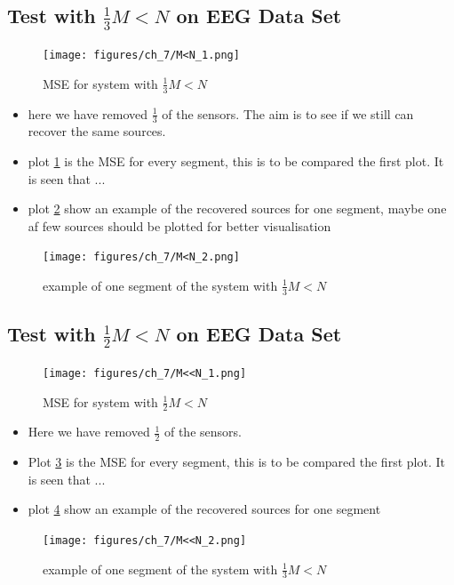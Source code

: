 \subsection{Test with $\frac{1}{3} M<N$ on EEG Data Set}
\begin{figure}[H]
    \centering
	\texttt{[image: figures/ch\_7/M<N\_1.png]}
	\caption{MSE for system with $\frac{1}{3} M<N$}
	\label{fig:M<N_1}
\end{figure}  
\begin{itemize}
\item  here we have removed $\frac{1}{3}$ of the sensors. The aim is to see if we still can recover the same sources. 
\item plot \ref{fig:M<N_1} is the MSE for every segment, this is to be compared the first plot. It is seen that ...
\item plot \ref{fig:M<N_2} show an example of the recovered sources for one segment, maybe one af few sources should be plotted for better visualisation
\end{itemize}
\begin{figure}[H]
    \centering
	\texttt{[image: figures/ch\_7/M<N\_2.png]}
	\caption{example of one segment of the system with $\frac{1}{3} M<N$}
	\label{fig:M<N_2}
\end{figure}  






\subsection{Test with $\frac{1}{2} M<N$ on EEG Data Set}
\begin{figure}[H]
    \centering
	\texttt{[image: figures/ch\_7/M<<N\_1.png]}
	\caption{MSE for system with $\frac{1}{2} M<N$}
	\label{fig:M<<N_1}
\end{figure}  
\begin{itemize}
\item Here we have removed $\frac{1}{2}$ of the sensors. 
\item Plot \ref{fig:M<<N_1} is the MSE for every segment, this is to be compared the first plot. It is seen that ...
\item plot \ref{fig:M<<N_2} show an example of the recovered sources for one segment
\end{itemize}
\begin{figure}[H]
    \centering
	\texttt{[image: figures/ch\_7/M<<N\_2.png]}
	\caption{example of one segment of the system with $\frac{1}{3} M<N$}
	\label{fig:M<<N_2}
\end{figure} 